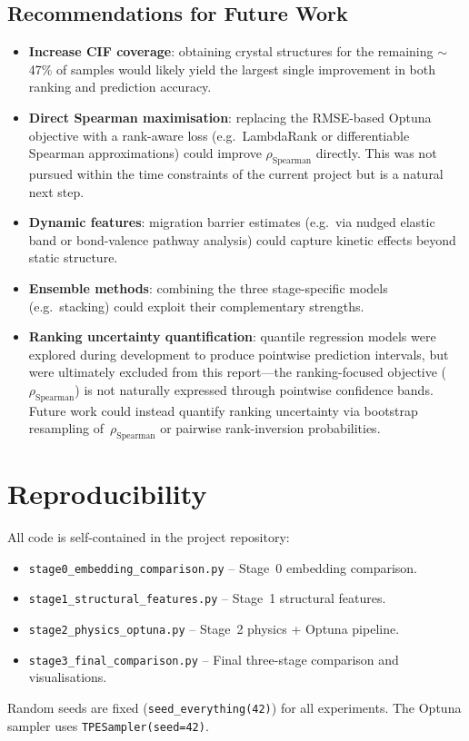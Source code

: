 \documentclass[11pt,a4paper]{article}
\newcommand{\rhoS}{\rho_{\text{Spearman}}}
\begin{document}
\subsection{Recommendations for Future Work}

\begin{itemize}[leftmargin=*]
      \item \textbf{Increase CIF coverage}: obtaining crystal structures for the
            remaining $\sim$47\% of samples would likely yield the largest single
            improvement in both ranking and prediction accuracy.
      \item \textbf{Direct Spearman maximisation}: replacing the RMSE-based
            Optuna objective with a rank-aware loss (e.g.\ LambdaRank or
            differentiable Spearman approximations) could improve $\rhoS$
            directly.  This was not pursued within the time constraints of the
            current project but is a natural next step.
      \item \textbf{Dynamic features}: migration barrier estimates (e.g.\ via
            nudged elastic band or bond-valence pathway analysis) could capture
            kinetic effects beyond static structure.
      \item \textbf{Ensemble methods}: combining the three stage-specific models
            (e.g.\ stacking) could exploit their complementary strengths.
      \item \textbf{Ranking uncertainty quantification}: quantile regression
            models were explored during development to produce pointwise
            prediction intervals, but were ultimately excluded from this
            report---the ranking-focused objective ($\rhoS$) is not
            naturally expressed through pointwise confidence bands.  Future work
            could instead quantify ranking uncertainty via bootstrap resampling
            of~$\rhoS$ or pairwise rank-inversion probabilities.
\end{itemize}

\section{Reproducibility}

All code is self-contained in the project repository:

\begin{itemize}[leftmargin=*]
      \item \texttt{stage0\_embedding\_comparison.py} -- Stage~0 embedding comparison.
      \item \texttt{stage1\_structural\_features.py} -- Stage~1 structural features.
      \item \texttt{stage2\_physics\_optuna.py} -- Stage~2 physics
            + Optuna pipeline.
      \item \texttt{stage3\_final\_comparison.py} -- Final three-stage
            comparison and visualisations.
\end{itemize}

Random seeds are fixed (\texttt{seed\_everything(42)}) for all experiments.
The Optuna sampler uses \texttt{TPESampler(seed=42)}.
\end{document}

